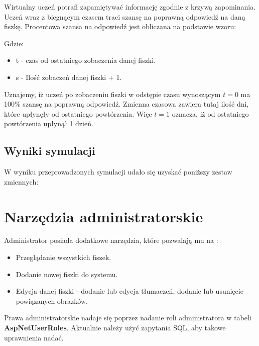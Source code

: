 Wirtualny uczeń potrafi zapamiętywać informację zgodnie z krzywą zapominania. Uczeń wraz z biegnącym czasem traci szansę na poprawną odpowiedź na daną fiszkę. Procentowa szansa na odpowiedź jest obliczana na podstawie wzoru:


Gdzie:
\begin{itemize}
\setlength\itemsep{1mm}
	\item t - czas od ostatniego zobaczenia danej fiszki.
	\item s - Ilość zobaczeń danej fiszki + 1.
\end{itemize}

Uznajemy, iż uczeń po zobaczeniu fiszki w odstępie czasu wynoszącym $t = 0$ ma 100\% szansę na poprawną odpowiedź. 
Zmienna czasowa zawiera tutaj ilość dni, które upłynęły od ostatniego powtórzenia. Więc $t = 1$ oznacza, iż od ostatniego powtórzenia upłynął 1 dzień.

\subsection{Wyniki symulacji}
W wyniku przeprowadzonych symulacji udało się uzyskać poniższy zestaw zmiennych:



\section{Narzędzia administratorskie}

Administrator posiada dodatkowe narzędzia, które pozwalają mu na :
\begin{itemize}
	\item Przeglądanie wszystkich fiszek.
	\item Dodanie nowej fiszki do systemu.
	\item Edycja danej fiszki - dodanie lub edycja tłumaczeń, dodanie lub usunięcie powiązanych obrazków.
\end{itemize}
Prawa administratorskie nadaje się poprzez nadanie roli administratora w tabeli \textbf{AspNetUserRoles}. Aktualnie należy użyć zapytania SQL, aby takowe uprawnienia nadać. 

